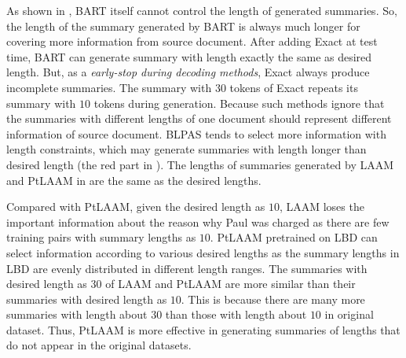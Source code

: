 As shown in , BART itself cannot control the length of generated summaries.
So, the length of the summary generated by BART is always much longer for covering more information from source document. 
After adding Exact at test time, BART can generate summary with length exactly the same as desired length. But, as a {\em early-stop during decoding methods}, Exact always produce incomplete summaries. The summary with $30$ tokens of Exact repeats its summary with $10$ tokens during generation. Because such methods ignore that the summaries with different lengths of one document should represent different information of source document. 
BLPAS tends to select more information with length constraints, which may generate summaries with length longer than desired length (the red part in ). 
The lengths of summaries generated by LAAM and PtLAAM in  are the same as the desired lengths. 

Compared with PtLAAM, given the desired length as $10$, LAAM loses the important information about the reason why Paul was charged as there are few training pairs with summary lengths as $10$. PtLAAM pretrained on LBD can select information according to various desired lengths as the summary lengths in LBD are evenly distributed in different length ranges. The summaries with desired length as $30$ of LAAM and PtLAAM are more similar than their summaries with desired length as $10$. 
This is because there are many more summaries with length about $30$ than those with length about $10$ in original dataset. Thus, PtLAAM is more effective in generating summaries of lengths that do not appear in the original datasets.

